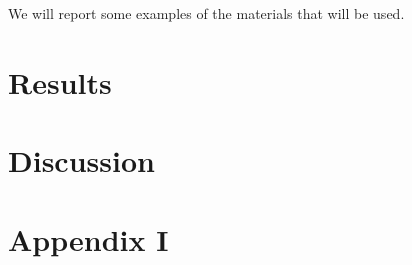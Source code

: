 \documentclass[10pt, a4]{article}
\begin{document}
We will report some examples of the materials that will be used.
\section{Results}
\blindtext

\section{Discussion}
\blindtext




\setlength{\bibhang}{.125in}
\setlength{\bibindent}{-\bibhang}

\vfill
\pagebreak



\appendix
\section{Appendix I} \label{appendix_I_sentences}
\end{document}

